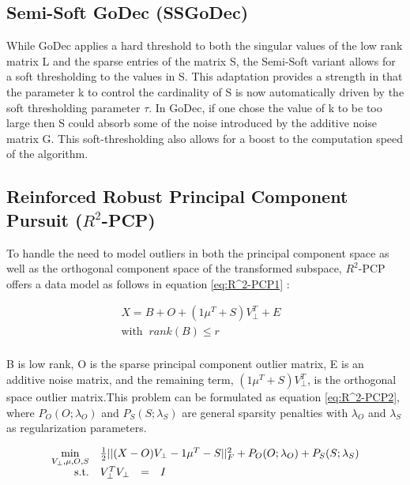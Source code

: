 \documentclass[conference]{IEEEtran}
\begin{document}
\subsection{Semi-Soft GoDec (SSGoDec) \cite{GoDec}}
While GoDec applies a hard threshold to both the singular values of the low rank matrix L and the sparse entries of the matrix S, the Semi-Soft variant allows for a soft thresholding to the values in S. This adaptation provides a strength in that the parameter k to control the cardinality of S is now automatically driven by the soft thresholding parameter $\tau$. In GoDec, if one chose the value of k to be too large then S could absorb some of the noise introduced by the additive noise matrix G. This soft-thresholding also allows for a boost to the computation speed of the algorithm.

\subsection{Reinforced Robust Principal Component Pursuit ($R^2$-PCP)}
To handle the need to model outliers in both the principal component space as well as the orthogonal component space of the transformed subspace, $R^2$-PCP offers a data model as follows in equation \ref{eq:R^2-PCP1} :

\begin{equation} \label{eq:R^2-PCP1}
\begin{array}{rrclcl}
X =  B + O + (1\mu^T + S)V_\perp^T + E & \\
 \textrm{with} \;\; rank(B) \leq r \\
\end{array}
\end{equation}

B is low rank, O is the sparse principal component outlier matrix, E is an additive noise matrix, and the remaining term, $(1\mu^T + S)V_\perp^T$, is the orthogonal space outlier matrix.This problem can be formulated as equation \ref{eq:R^2-PCP2}, where $P_O(O;\lambda_O)$ and $P_S(S;\lambda_S)$ are general sparsity penalties with $\lambda_O$ and $\lambda_S$ as regularization parameters.

\begin{equation} \label{eq:R^2-PCP2}
\begin{array}{rrclcl}
\displaystyle \min_{V_\perp, \mu, O, S} & \multicolumn{3}{l}{\frac{1}{2}||(X-O)V_\perp - 1\mu^T - S||_F^2 + P_O(O;\lambda_O) + P_S(S;\lambda_S) } \\
\textrm{s.t.} & V_\perp^TV_\perp & = & I \\
\end{array}
\end{equation}
\end{document}
